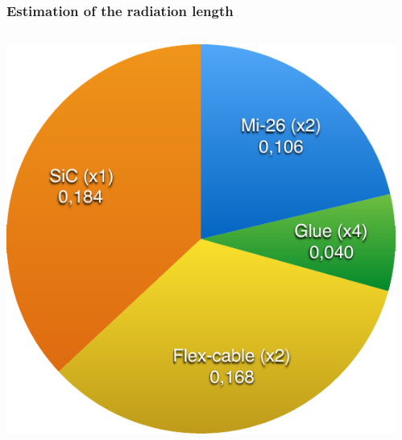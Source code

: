 \documentclass{beamer}
\begin{document}
    \begin{frame}
      \frametitle{Estimation of the radiation length}

      \begin{columns}[c]
        \begin{column}{5cm}
          \centering
          \includegraphics[width = \textwidth]{Pictures/X0.pdf}
          
        \end{column}
        \begin{column}{5cm}
          \centering


\end{column}
\end{columns}
\end{frame}
\end{document}

